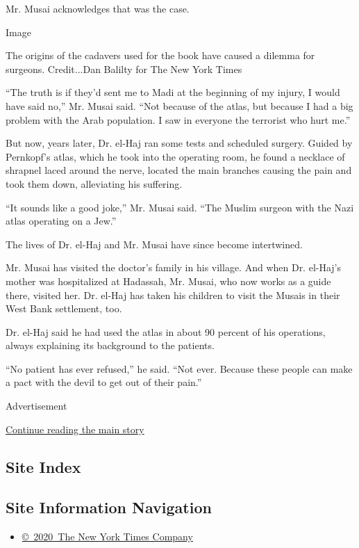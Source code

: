Mr. Musai acknowledges that was the case.

Image

The origins of the cadavers used for the book have caused a dilemma for
surgeons. Credit...Dan Balilty for The New York Times

``The truth is if they'd sent me to Madi at the beginning of my injury,
I would have said no,'' Mr. Musai said. ``Not because of the atlas, but
because I had a big problem with the Arab population. I saw in everyone
the terrorist who hurt me.''

But now, years later, Dr. el-Haj ran some tests and scheduled surgery.
Guided by Pernkopf's atlas, which he took into the operating room, he
found a necklace of shrapnel laced around the nerve, located the main
branches causing the pain and took them down, alleviating his suffering.

``It sounds like a good joke,'' Mr. Musai said. ``The Muslim surgeon
with the Nazi atlas operating on a Jew.''

The lives of Dr. el-Haj and Mr. Musai have since become intertwined.

Mr. Musai has visited the doctor's family in his village. And when Dr.
el-Haj's mother was hospitalized at Hadassah, Mr. Musai, who now works
as a guide there, visited her. Dr. el-Haj has taken his children to
visit the Musais in their West Bank settlement, too.

Dr. el-Haj said he had used the atlas in about 90 percent of his
operations, always explaining its background to the patients.

``No patient has ever refused,'' he said. ``Not ever. Because these
people can make a pact with the devil to get out of their pain.''

Advertisement

\protect\hyperlink{after-bottom}{Continue reading the main story}

\hypertarget{site-index}{%
\subsection{Site Index}\label{site-index}}

\hypertarget{site-information-navigation}{%
\subsection{Site Information
Navigation}\label{site-information-navigation}}

\begin{itemize}
\tightlist
\item
  \href{https://help.nytimes.com/hc/en-us/articles/115014792127-Copyright-notice}{©~2020~The
  New York Times Company}
\end{itemize}

